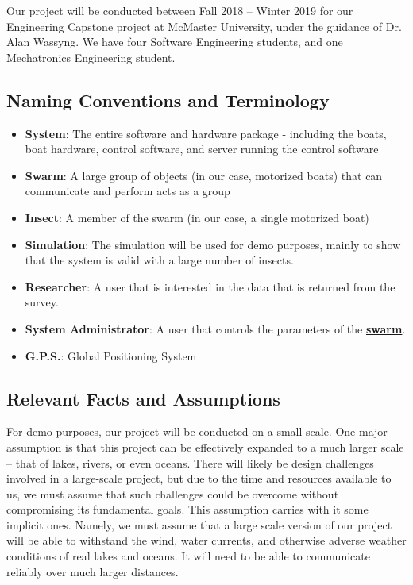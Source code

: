 \documentclass[11pt]{article}
\begin{document}
Our project will be conducted between Fall 2018 – Winter 2019 for our Engineering Capstone project at McMaster University, under the guidance of Dr. Alan Wassyng. We have four Software Engineering students, and one Mechatronics Engineering student.

\subsection{Naming Conventions and Terminology}

\label{sec:definitions}
\begin{itemize}
\item \textbf{System}: The entire software and hardware package - including the boats,
boat hardware, control software, and server running the control software
\item \textbf{Swarm}: A large group of objects (in our case, motorized boats) that can communicate and perform acts as a group
\item \textbf{Insect}: A member of the swarm (in our case, a single motorized boat)
\item \textbf{Simulation}: The simulation will be used for demo purposes, mainly to show that
the system is valid with a large number of insects.
\item \textbf{Researcher}: A user that is interested in the data that is returned from the survey.
\item \textbf{System Administrator}: A user that controls the parameters of the \hyperref[sec:definitions]{\textbf{swarm}}.
\item \textbf{G.P.S.}: Global Positioning System
\end{itemize}

\subsection{Relevant Facts and Assumptions}

For demo purposes, our project will be conducted on a small scale. One major assumption is that this project can be effectively expanded to a much larger scale – that of lakes, rivers, or even oceans. There will likely be design challenges involved in a large-scale project, but due to the time and resources available to us, we must assume that such challenges could be overcome without compromising its fundamental goals. This assumption carries with it some implicit ones. Namely, we must assume that a large scale version of our project will be able to withstand the wind, water currents, and otherwise adverse weather conditions of real lakes and oceans. It will need to be able to communicate reliably over much larger distances.\\
\end{document}
